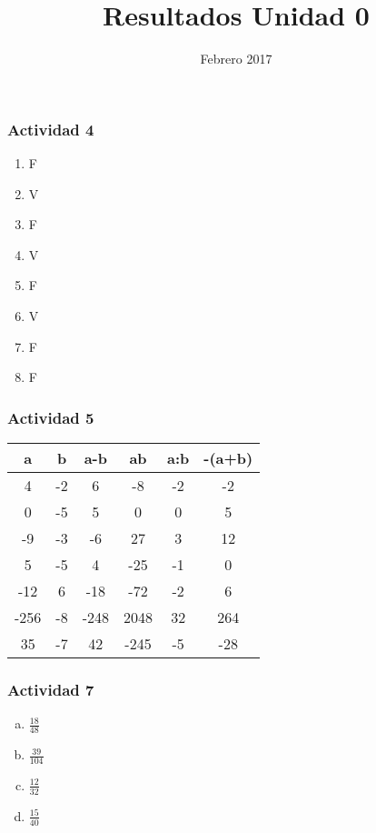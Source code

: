 \documentclass[a4paper, twocolumn]{article}
\title{Resultados Unidad 0}
\date{Febrero 2017}
\begin{document}
\maketitle
\subsubsection*{Actividad 4}
\begin{enumerate}[1)]
\item{F}
\item{V}
\item{F}
\item{V}
\item{F}
\item{V}
\item{F}
\item{F}
\end{enumerate}
\subsubsection*{Actividad 5}
\begin{table}[h]
\centering

\label{my-label}
\begin{tabular}{@{}cccccc@{}}
\toprule
a    & b  & a-b  & ab   & a:b & -(a+b) \\ \midrule
4    & -2 & 6    & -8   & -2  & -2     \\
0    & -5 & 5    & 0    & 0   & 5      \\
-9   & -3 & -6   & 27   & 3   & 12     \\
5    & -5 & 4    & -25  & -1  & 0      \\
-12  & 6  & -18  & -72  & -2  & 6      \\
-256 & -8 & -248 & 2048 & 32  & 264    \\
35   & -7 & 42   & -245 & -5  & -28   
\end{tabular}
\end{table}



\subsubsection*{Actividad 7}
\begin{enumerate}[a)]
\item $\frac{18}{48}$
\item $\frac{39}{104}$
\item $\frac{12}{32}$
\item $\frac{15}{40}$
\end{enumerate}
\end{document}
